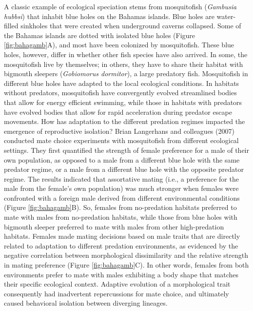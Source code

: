 \documentclass[
]{book}
\begin{document}
A classic example of ecological speciation stems from mosquitofish (\emph{Gambusia hubbsi}) that inhabit blue holes on the Bahamas islands. Blue holes are water-filled sinkholes that were created when underground caverns collapsed. Some of the Bahamas islands are dotted with isolated blue holes (Figure \ref{fig:bahagamb}A), and most have been colonized by mosquitofish. These blue holes, however, differ in whether other fish species have also arrived. In some, the mosquitofish live by themselves; in others, they have to share their habitat with bigmouth sleepers (\emph{Gobiomorus dormitor}), a large predatory fish. Mosquitofish in different blue holes have adapted to the local ecological conditions. In habitats without predators, mosquitofish have convergently evolved streamlined bodies that allow for energy efficient swimming, while those in habitats with predators have evolved bodies that allow for rapid acceleration during predator escape movements. How has adaptation to the different predation regimes impacted the emergence of reproductive isolation? Brian Langerhans and colleagues (2007) conducted mate choice experiments with mosquitofish from different ecological settings. They first quantified the strength of female preference for a male of their own population, as opposed to a male from a different blue hole with the same predator regime, or a male from a different blue hole with the opposite predator regime. The results indicated that assortative mating (i.e., a preference for the male from the female's own population) was much stronger when females were confronted with a foreign male derived from different environmental conditions (Figure \ref{fig:bahagamb}B). So, females from no-predation habitats preferred to mate with males from no-predation habitats, while those from blue holes with bigmouth sleeper preferred to mate with males from other high-predation habitats. Females made mating decisions based on male traits that are directly related to adaptation to different predation environments, as evidenced by the negative correlation between morphological dissimilarity and the relative strength in mating preference (Figure \ref{fig:bahagamb}C). In other words, females from both environments prefer to mate with males exhibiting a body shape that matches their specific ecological context. Adaptive evolution of a morphological trait consequently had inadvertent repercussions for mate choice, and ultimately caused behavioral isolation between diverging lineages.
\end{document}
